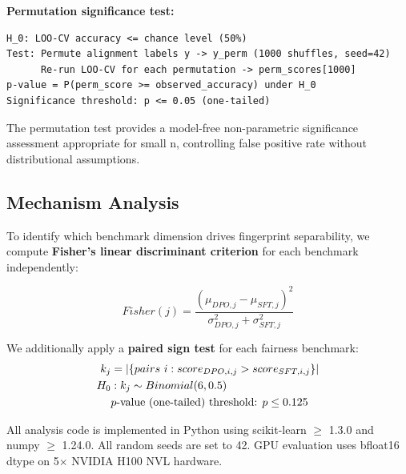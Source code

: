 \textbf{Permutation significance test:}

\begin{verbatim}
H_0: LOO-CV accuracy <= chance level (50%)
Test: Permute alignment labels y -> y_perm (1000 shuffles, seed=42)
      Re-run LOO-CV for each permutation -> perm_scores[1000]
p-value = P(perm_score >= observed_accuracy) under H_0
Significance threshold: p <= 0.05 (one-tailed)
\end{verbatim}

The permutation test provides a model-free non-parametric significance assessment
appropriate for small n, controlling false positive rate without distributional
assumptions.

\subsection{Mechanism Analysis}

To identify which benchmark dimension drives fingerprint separability, we compute
\textbf{Fisher's linear discriminant criterion} for each benchmark independently:

\begin{equation}
Fisher(j) = \frac{(\mu_{DPO,j} - \mu_{SFT,j})^2}{\sigma^2_{DPO,j} + \sigma^2_{SFT,j}}
\end{equation}

We additionally apply a \textbf{paired sign test} for each fairness benchmark:
\begin{align}
k_j &= |\{pairs\ i : score_{DPO,i,j} > score_{SFT,i,j}\}| \notag\\
H_0&: k_j \sim Binomial(6, 0.5) \notag\\
&p\text{-value (one-tailed) threshold: } p \leq 0.125 \notag
\end{align}

All analysis code is implemented in Python using scikit-learn $\geq$ 1.3.0 and numpy $\geq$ 1.24.0.
All random seeds are set to 42. GPU evaluation uses bfloat16 dtype on 5$\times$ NVIDIA H100 NVL hardware.
